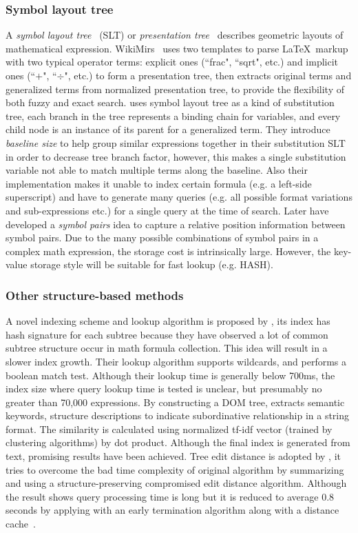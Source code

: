 \subsubsection*{Symbol layout tree}
A \textit{symbol layout tree}~\cite{symbollayout12} (SLT) or \textit{presentation tree}~\cite{WikiMirs13} describes geometric layouts of mathematical expression. 
WikiMirs~\cite{WikiMirs13} uses two templates to parse \LaTeX\  markup with two typical operator terms: explicit ones (``\bbb frac", ``\bbb sqrt", etc.) and implicit ones (``$+$", ``$\div$", etc.) to form a presentation tree, then extracts original terms and generalized terms from normalized presentation tree, to provide the flexibility of both fuzzy and exact search. 
\cite{symbollayout12} uses symbol layout tree as a kind of substitution tree, each branch in the tree represents a binding chain for variables, and every child node is an instance of its parent for a generalized term. 
They introduce \textit{baseline size} to help group similar expressions together in their substitution SLT in order to decrease tree branch factor, however, this makes a single substitution variable not able to match multiple terms along the baseline. 
Also their implementation makes it unable to index certain formula (e.g. a left-side superscript) and have to generate many queries (e.g. all possible format variations and sub-expressions etc.) for a single query at the time of search.
Later \cite{symbolpairs15,symbolpair15:2} have developed a \textit{symbol pairs} idea to capture a relative position information between symbol pairs. Due to the many possible combinations of symbol pairs in a complex math expression, the storage cost is intrinsically large. However, the key-value storage style will be suitable for fast lookup (e.g. HASH). 

\subsubsection*{Other structure-based methods}
A novel indexing scheme and lookup algorithm is proposed by \cite{newretrievalsystem}, its index has hash signature for each subtree because they have observed a lot of common subtree structure occur in math formula collection. This idea will result in a slower index growth. Their lookup algorithm supports wildcards, and performs a boolean match test. Although their lookup time is generally below 700ms, the index size where query lookup time is tested is unclear, but presumably no greater than 70,000 expressions.
By constructing a DOM tree, \cite{DOMextraction} extracts semantic keywords, structure descriptions to indicate subordinative relationship in a string format. The similarity is calculated using normalized tf-idf vector (trained by clustering algorithms) by dot product. Although the final index is generated from text, promising results have been achieved.  
Tree edit distance is adopted by \cite{editdisXML11}, it tries to overcome the bad time complexity of original algorithm by summarizing and using a structure-preserving compromised edit distance algorithm. Although the result shows query processing time is long but it is reduced to average 0.8 seconds by applying with an early termination algorithm along with a distance cache~\cite{editdisXML13}.

